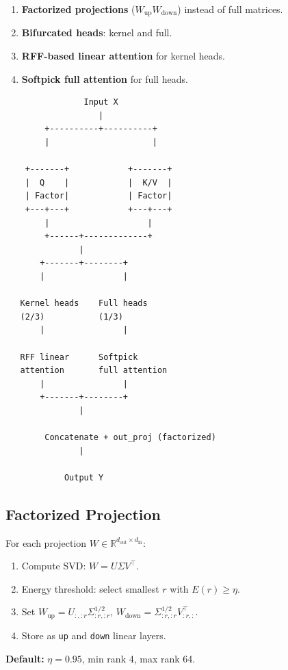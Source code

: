 \begin{enumerate}
\item \textbf{Factorized projections} ($W_\text{up} W_\text{down}$) instead of full
  matrices.
\item \textbf{Bifurcated heads}: kernel and full.
\item \textbf{RFF-based linear attention} for kernel heads.
\item \textbf{Softpick full attention} for full heads.

\end{enumerate}
\begin{lstlisting}
                Input X
                   |
        +----------+----------+
        |                     |
                               
    +-------+            +-------+
    |  Q    |            |  K/V  |
    | Factor|            | Factor|
    +---+---+            +---+---+
        |                    |
        +------+-------------+
               |
       +-------+--------+
       |                |
                         
   Kernel heads    Full heads
   (2/3)           (1/3)
       |                |
                         
   RFF linear      Softpick
   attention       full attention
       |                |
       +-------+--------+
               |
                
        Concatenate + out_proj (factorized)
               |
                
            Output Y
\end{lstlisting}

\subsection{Factorized Projection}

For each projection $W \in \mathbb{R}^{d_\text{out} \times d_\text{in}}$:

\begin{enumerate}
\item Compute SVD: $W = U \Sigma V^\top$.
\item Energy threshold: select smallest $r$ with $E(r) \geq \eta$.
\item Set $W_\text{up} = U_{:, :r} \Sigma_{:r, :r}^{1/2}$, $W_\text{down} = \Sigma_{:r, :r}^{1/2} V_{:r, :}^\top$.
\item Store as \texttt{up} and \texttt{down} linear layers.

\end{enumerate}
\textbf{Default:} $\eta = 0.95$, min rank 4, max rank 64.

